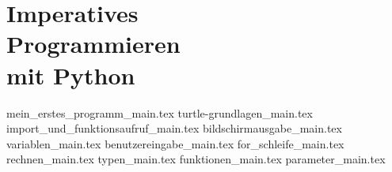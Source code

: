 
\part[Imperatives Programmieren mit Python]{Imperatives \\ Programmieren \\ mit Python}
\label{part-programmieren-mit-python}

{mein_erstes_programm_main.tex}
{turtle-grundlagen_main.tex}
{import_und_funktionsaufruf_main.tex}
{bildschirmausgabe_main.tex}
{variablen_main.tex}
{benutzereingabe_main.tex}
{for_schleife_main.tex}
{rechnen_main.tex}
{typen_main.tex}
{funktionen_main.tex}
{parameter_main.tex}
